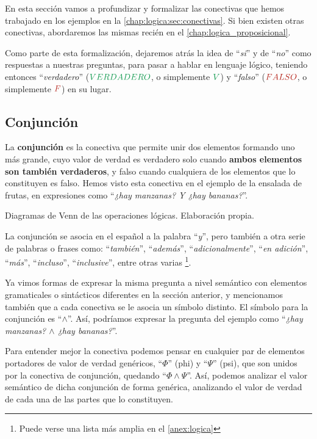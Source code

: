 En esta sección vamos a profundizar y formalizar las conectivas que hemos
trabajado en los ejemplos en la \autoref{chap:logica:sec:conectivas}. Si bien
existen otras conectivas, abordaremos las mismas recién en el
\autoref{chap:logica_proposicional}.

Como parte de esta formalización, dejaremos atrás la idea de ``\textit{si}'' y
de ``\textit{no}'' como respuestas a nuestras preguntas, para pasar a hablar en
lenguaje lógico, teniendo entonces ``\textit{verdadero}'' ($\ltruefull$, o
simplemente $\ltrue$) y ``\textit{falso}'' ($\lfalsefull$, o simplemente
$\lfalse$) en su lugar.

\subsection{Conjunción}
\label{chap:logica:subsec:and}

La \textbf{conjunción} es la conectiva que permite unir dos elementos formando
uno más grande, cuyo valor de verdad es verdadero solo cuando \textbf{ambos
elementos son también verdaderos}, y falso cuando cualquiera de los elementos
que lo constituyen es falso. Hemos visto esta conectiva en el ejemplo de la
ensalada de frutas, en expresiones como ``\textit{¿hay manzanas? Y ¿hay
bananas?}''.

{Diagramas de Venn de las operaciones lógicas.} {Elaboración propia.}

La conjunción se asocia en el español a la palabra ``\textit{y}'', pero también
a otra serie de palabras o frases como: ``\textit{también}'',
``\textit{además}'', ``\textit{adicionalmente}'', ``\textit{en adición}'',
``\textit{más}'', ``\textit{incluso}'', ``\textit{inclusive}'',  entre otras
varias \footnote{ Puede verse una lista más amplia en el
    \autoref{anex:logica}
}.

Ya vimos formas de expresar la misma pregunta a nivel semántico con elementos
gramaticales o sintácticos diferentes en la sección anterior, y mencionamos
también que a cada conectiva se le asocia un símbolo distinto. El símbolo para
la conjunción es ``$\land$''. Así, podríamos expresar la pregunta del ejemplo
como ``\textit{¿hay manzanas? $\land$ ¿hay bananas?}''.

Para entender mejor la conectiva podemos pensar en cualquier par de elementos
portadores de valor de verdad genéricos, ``$\Phi$'' (phi) y ``$\Psi$'' (psi),
que son unidos por la conectiva de conjunción, quedando ``$\Phi \land \Psi$''.
Así, podemos analizar el valor semántico de dicha conjunción de forma genérica,
analizando el valor de verdad de cada una de las partes que lo constituyen.

